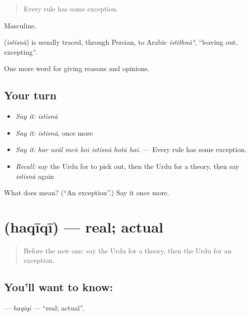 \begin{quote}
Every rule has some exception.
\end{quote}

Masculine.

\begin{cousinweb}
\textbf{} (\emph{istisnā}) is usually traced, through Persian, to Arabic \emph{istithnāʾ}, \textquotedblleft{}leaving out, excepting\textquotedblright{}.
\end{cousinweb}

\begin{grammarlens}[title={What you've built}]
One more word for giving reasons and opinions.
\end{grammarlens}

\subsection*{Your turn}
\begin{itemize}
\raggedright
  \item \emph{Say it:} \emph{istisnā}
  \item \emph{Say it:} \emph{istisnā}, once more
  \item \emph{Say it:} \emph{har usūl meṅ koī istisnā hotā hai.} — Every rule has some exception.
  \item \emph{Recall:} say the Urdu for to pick out, then the Urdu for a theory, then say \emph{istisnā} again
\end{itemize}

\begin{tcolorbox}[breakable,colback=teal!4,colframe=teal!35!black,title={Before you move on}]
What does  mean? (\textquotedblleft{}An exception\textquotedblright{}.) Say it once more.
\end{tcolorbox}
\section[\texorpdfstring{\ur{حقیقی} (haqīqī)}{حقیقی (haqīqī)}]{ (haqīqī) — real; actual}

\label{lesson:UR-C353-haqiqi}



\begin{quote}
Before the new one: say the Urdu for a theory, then the Urdu for an exception.
\end{quote}

\subsection*{You'll want to know: }
\textbf{} — \emph{haqīqī} — \textquotedblleft{}real; actual\textquotedblright{}.

